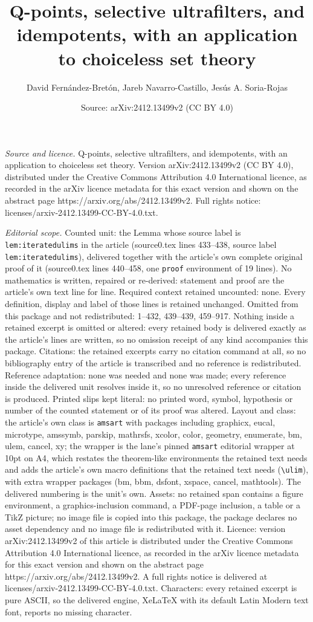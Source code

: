 \documentclass[10pt,a4paper]{amsart}
\title[Q-points, selective ultrafilters, and idempotents, with an a]{Q-points, selective ultrafilters, and idempotents, with an application to choiceless set theory}
\author{David Fern\'andez-Bret\'on, Jareb Navarro-Castillo, Jes\'us A. Soria-Rojas}
\date{Source: arXiv:2412.13499v2 (CC BY 4.0)}
\begin{document}
\maketitle

\noindent\emph{Source and licence.} Q-points, selective ultrafilters, and idempotents, with an application to choiceless set theory. Version arXiv:2412.13499v2 (CC BY 4.0), distributed under the Creative Commons Attribution 4.0 International licence, as recorded in the arXiv licence metadata for this exact version and shown on the abstract page https://arxiv.org/abs/2412.13499v2. Full rights notice: licenses/arxiv-2412.13499-CC-BY-4.0.txt.\par\smallskip

\noindent\textit{Editorial scope.} Counted unit: the Lemma whose source label is \texttt{lem:iteratedulims} in the article (source0.tex lines 433--438, source label \texttt{lem:iteratedulims}), delivered together with the article's own complete original proof of it (source0.tex lines 440--458, one \texttt{proof} environment of 19 lines). No mathematics is written, repaired or re-derived: statement and proof are the article's own text line for line. Required context retained uncounted: none. Every definition, display and label of those lines is retained unchanged. Omitted from this package and not redistributed: 1--432, 439--439, 459--917. Nothing inside a retained excerpt is omitted or altered: every retained body is delivered exactly as the article's lines are written, so no omission receipt of any kind accompanies this package. Citations: the retained excerpts carry no citation command at all, so no bibliography entry of the article is transcribed and no reference is redistributed. Reference adaptation: none was needed and none was made; every reference inside the delivered unit resolves inside it, so no unresolved reference or citation is produced. Printed slips kept literal: no printed word, symbol, hypothesis or number of the counted statement or of its proof was altered. Layout and class: the article's own class is \texttt{amsart} with packages including graphicx, eucal, microtype, amssymb, parskip, mathrsfs, xcolor, color, geometry, enumerate, bm, ulem, cancel, xy; the wrapper is the lane's pinned \texttt{amsart} editorial wrapper at 10pt on A4, which restates the theorem-like environments the retained text needs and adds the article's own macro definitions that the retained text needs (\texttt{\textbackslash ulim}), with extra wrapper packages (bm, bbm, dsfont, xspace, cancel, mathtools). The delivered numbering is the unit's own. Assets: no retained span contains a figure environment, a graphics-inclusion command, a PDF-page inclusion, a table or a TikZ picture; no image file is copied into this package, the package declares no asset dependency and no image file is redistributed with it. Licence: version arXiv:2412.13499v2 of this article is distributed under the Creative Commons Attribution 4.0 International licence, as recorded in the arXiv licence metadata for this exact version and shown on the abstract page https://arxiv.org/abs/2412.13499v2. A full rights notice is delivered at licenses/arxiv-2412.13499-CC-BY-4.0.txt. Characters: every retained excerpt is pure ASCII, so the delivered engine, XeLaTeX with its default Latin Modern text font, reports no missing character.
\end{document}
